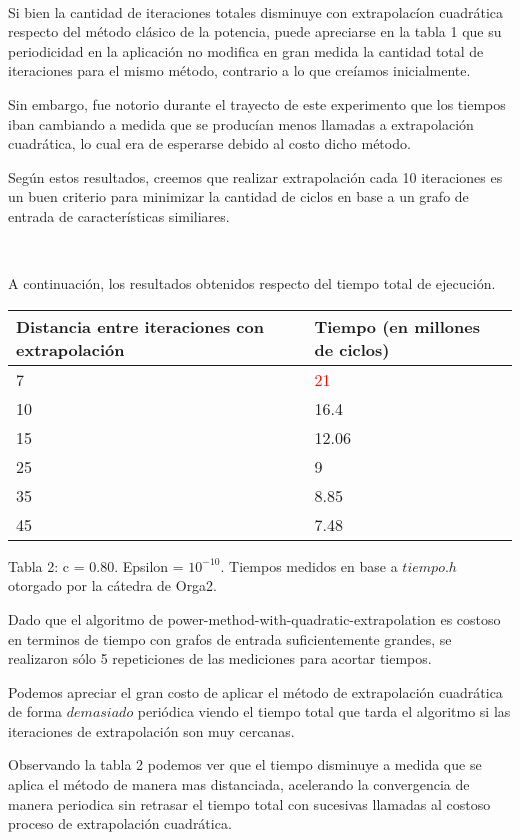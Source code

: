 ~

Si bien la cantidad de iteraciones totales disminuye con extrapolac\'ion cuadr\'atica respecto del m\'etodo cl\'asico de la potencia, puede apreciarse en la tabla 1 que su periodicidad en la aplicaci\'on no modifica en gran medida la cantidad total de iteraciones para el mismo m\'etodo, contrario a lo que cre\'iamos inicialmente. 

Sin embargo, fue notorio durante el trayecto de este experimento que los tiempos iban cambiando a medida que se produc\'ian menos llamadas a extrapolaci\'on cuadr\'atica, lo cual era de esperarse debido al costo dicho m\'etodo.

Seg\'un estos resultados, creemos que realizar extrapolaci\'on cada 10 iteraciones es un buen criterio para minimizar la cantidad de ciclos en base a un grafo de entrada de caracter\'isticas similiares.

~

A continuaci\'on, los resultados obtenidos respecto del tiempo total de ejecuci\'on. 


\begin{center}
    \small{
    \begin{tabular}{| l | l |}
    \hline
    Distancia entre iteraciones con extrapolaci\'on & Tiempo (en millones de ciclos) \\ \hline
    7 & \textcolor{red}{21} \\ \hline
    10 & 16.4 \\ \hline
    15 & 12.06 \\ \hline
    25 & 9 \\ \hline
    35 & 8.85 \\ \hline
    45 & 7.48 \\ \hline
    
    \end{tabular}
    }
\end{center}
\begin{center}
Tabla 2: c = 0.80. Epsilon = $10^{-10}$. Tiempos medidos en base a $tiempo.h$ otorgado por la c\'atedra de Orga2.
\end{center}

Dado que el algoritmo de power-method-with-quadratic-extrapolation es costoso en terminos de tiempo con grafos de entrada suficientemente grandes, se realizaron s\'olo 5 repeticiones de las mediciones para acortar tiempos. 

Podemos apreciar el gran costo de aplicar el m\'etodo de extrapolaci\'on cuadr\'atica de forma $demasiado$ peri\'odica viendo el tiempo total que tarda el algoritmo si las iteraciones de extrapolaci\'on son muy cercanas.

Observando la tabla 2 podemos ver que el tiempo disminuye a medida que se aplica el m\'etodo de manera mas distanciada, acelerando la convergencia de manera periodica sin retrasar el tiempo total con sucesivas llamadas al costoso proceso de extrapolaci\'on cuadr\'atica.






